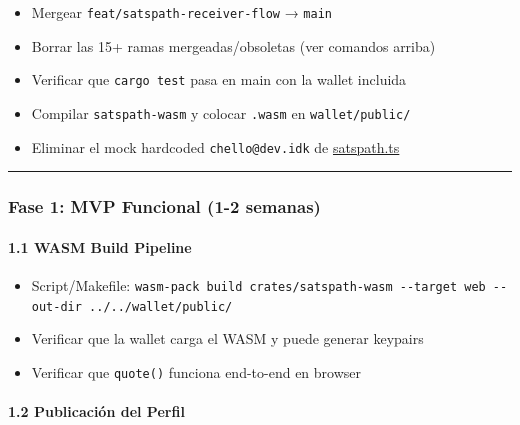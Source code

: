 \documentclass[
]{article}
\providecommand{\tightlist}{%
  \setlength{\itemsep}{0pt}\setlength{\parskip}{0pt}}
\begin{document}
\begin{itemize}
\tightlist
\item[$\square$]
  Mergear \texttt{feat/satspath-receiver-flow} → \texttt{main}
\item[$\square$]
  Borrar las 15+ ramas mergeadas/obsoletas (ver comandos arriba)
\item[$\square$]
  Verificar que \texttt{cargo\ test} pasa en main con la wallet incluida
\item[$\square$]
  Compilar \texttt{satspath-wasm} y colocar \texttt{.wasm} en
  \texttt{wallet/public/}
\item[$\square$]
  Eliminar el mock hardcoded \texttt{chello@dev.idk} de
  \href{file:///home/chelo/antigravity/PlanB/satspath/wallet/src/lib/satspath.ts\#L49-L55}{satspath.ts}
\end{itemize}

\begin{center}\rule{0.5\linewidth}{0.5pt}\end{center}

\hypertarget{fase-1-mvp-funcional-1-2-semanas}{%
\subsubsection{Fase 1: MVP Funcional (1-2
semanas)}\label{fase-1-mvp-funcional-1-2-semanas}}

\hypertarget{wasm-build-pipeline}{%
\paragraph{1.1 WASM Build Pipeline}\label{wasm-build-pipeline}}

\begin{itemize}
\tightlist
\item[$\square$]
  Script/Makefile:
  \texttt{wasm-pack\ build\ crates/satspath-wasm\ -\/-target\ web\ -\/-out-dir\ ../../wallet/public/}
\item[$\square$]
  Verificar que la wallet carga el WASM y puede generar keypairs
\item[$\square$]
  Verificar que \texttt{quote()} funciona end-to-end en browser
\end{itemize}

\hypertarget{publicaciuxf3n-del-perfil}{%
\paragraph{1.2 Publicación del Perfil}\label{publicaciuxf3n-del-perfil}}
\end{document}
